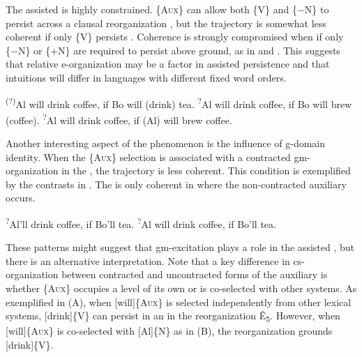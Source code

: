   The assisted  is highly constrained. \{A\textsc{ux}\} can allow both \{V\} and \{−N\} to persist across a clausal reorganization , but the trajectory is somewhat less coherent if only \{V\} persists . Coherence is strongly compromised when if only \{−N\} or \{+N\} are required to persist above ground, as in  and . This suggests that relative e-or\-ga\-ni\-za\-tion may be a factor in assisted persistence and that  intuitions will differ in languages with different fixed word orders. 

\ea\label{ex:7:4}
\label{ex:7:4a} \ex\label{ex:7:4b}\textsuperscript{(?)}Al will drink coffee, if Bo will (drink) tea.
\ex\label{ex:7:4c}\textsuperscript{?}Al will drink coffee, if Bo will brew (coffee).
\ex\label{ex:7:4d}\textsuperscript{?}Al will drink coffee, if (Al) will brew coffee.
\z
\z

  Another interesting aspect of the phenomenon is the influence of g-domain identity. When the \{A\textsc{ux}\} selection is associated with a contracted gm-or\-ga\-ni\-za\-tion in the , the  trajectory is less coherent. This condition is exemplified by the  contrasts in . The  is only coherent in  where the non-contracted auxiliary occurs.

\ea\label{ex:7:5}
\ea\label{ex:7:5a}\textsuperscript{?}Al’ll drink coffee, if Bo’ll tea.      
\ex\label{ex:7:5b}\textsuperscript{?}Al will drink coffee, if Bo’ll tea.
\label{ex:7:5c}
\z
\z

  These patterns might suggest that gm-excitation plays a role in the assisted , but there is an alternative interpretation. Note that a key difference in cs-or\-ga\-ni\-za\-tion between contracted and uncontracted forms of the auxiliary is whether \{A\textsc{ux}\} occupies a level of its own or is co-selected with other systems. As exemplified in {}(A), when [will]\{A\textsc{ux}\} is selected independently from other lexical systems, [drink]\{V\} can persist in an  in the reorganization Ê\textsubscript{5}. However, when [will]\{A\textsc{ux}\} is co-selected with [Al]\{N\} as in {}(B), the reorganization grounds [drink]\{V\}.

